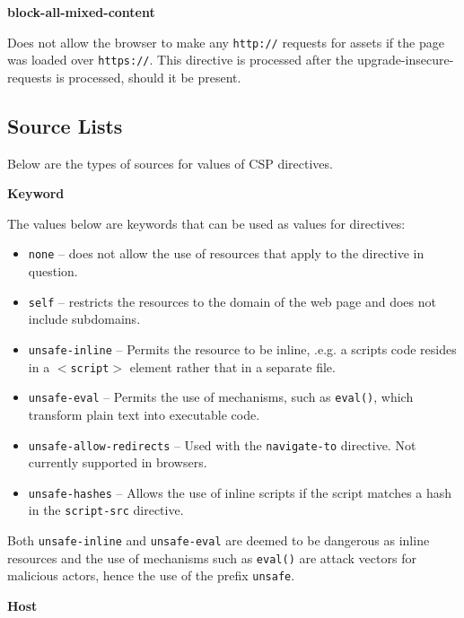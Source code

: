 \documentclass{mscreport}
\begin{document}
\vspace{0.7cm} \noindent
\textbf{block-all-mixed-content}

\vspace{0.3cm} \noindent
Does not allow the browser to make any \texttt{http://} requests for assets if the page was loaded over \texttt{https://}. This directive is processed after the upgrade-insecure-requests is processed, should it be present.

\subsection{Source Lists}

Below are the types of sources for values of CSP directives.


\vspace{0.7cm} \noindent
\textbf{Keyword}

\vspace{0.3cm} \noindent
The values below are keywords that can be used as values for directives:
\begin{itemize}
  \setlength\itemsep{0.1em}
  \item \texttt{none} – does not allow the use of resources that apply to the directive in question.
  \item \texttt{self} – restricts the resources to the domain of the web page and does not include subdomains.
  \item \texttt{unsafe-inline} – Permits the resource to be inline, .e.g. a scripts code resides in a \texttt{$<$script$>$} element rather that in a separate file.
  \item \texttt{unsafe-eval} – Permits the use of mechanisms, such as \texttt{eval()}, which transform plain text into executable code.
  \item \texttt{unsafe-allow-redirects} – Used with the \texttt{navigate-to} directive. Not currently supported in browsers.
  \item \texttt{unsafe-hashes} – Allows the use of inline scripts if the script matches a hash in the \texttt{script-src} directive.
  
\end{itemize}

\noindent
Both \texttt{unsafe-inline} and \texttt{unsafe-eval} are deemed to be dangerous as inline resources and the use of mechanisms such as \texttt{eval()} are attack vectors for malicious actors, hence the use of the prefix \texttt{unsafe}.

\vspace{0.7cm} \noindent
\textbf{Host}
\end{document}
